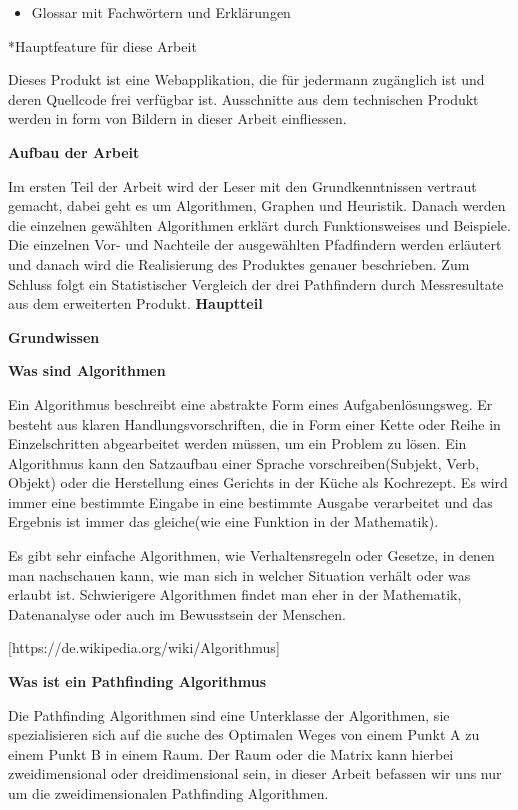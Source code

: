 \begin{itemize}
\item
  Glossar mit Fachwörtern und Erklärungen
\end{itemize}

*Hauptfeature für diese Arbeit

Dieses Produkt ist eine Webapplikation, die für jedermann zugänglich ist
und deren Quellcode frei verfügbar ist. Ausschnitte aus dem technischen
Produkt werden in form von Bildern in dieser Arbeit einfliessen.

\textbf{Aufbau der Arbeit}

Im ersten Teil der Arbeit wird der Leser mit den Grundkenntnissen
vertraut gemacht, dabei geht es um Algorithmen, Graphen und Heuristik.
Danach werden die einzelnen gewählten Algorithmen erklärt durch
Funktionsweises und Beispiele. Die einzelnen Vor- und Nachteile der
ausgewählten Pfadfindern werden erläutert und danach wird die
Realisierung des Produktes genauer beschrieben. Zum Schluss folgt ein
Statistischer Vergleich der drei Pathfindern durch Messresultate aus dem
erweiterten Produkt.
\textbf{Hauptteil}

\textbf{Grundwissen}

\textbf{Was sind Algorithmen}

Ein Algorithmus beschreibt eine abstrakte Form eines Aufgabenlösungsweg.
Er besteht aus klaren Handlungsvorschriften, die in Form einer Kette
oder Reihe in Einzelschritten abgearbeitet werden müssen, um ein Problem
zu lösen. Ein Algorithmus kann den Satzaufbau einer Sprache
vorschreiben(Subjekt, Verb, Objekt) oder die Herstellung eines Gerichts
in der Küche als Kochrezept. Es wird immer eine bestimmte Eingabe in
eine bestimmte Ausgabe verarbeitet und das Ergebnis ist immer das
gleiche(wie eine Funktion in der Mathematik).

Es gibt sehr einfache Algorithmen, wie Verhaltensregeln oder Gesetze, in
denen man nachschauen kann, wie man sich in welcher Situation verhält
oder was erlaubt ist. Schwierigere Algorithmen findet man eher in der
Mathematik, Datenanalyse oder auch im Bewusstsein der Menschen.

{[}https://de.wikipedia.org/wiki/Algorithmus{]}

\textbf{Was ist ein Pathfinding Algorithmus}

Die Pathfinding Algorithmen sind eine Unterklasse der Algorithmen, sie
spezialisieren sich auf die suche des Optimalen Weges von einem Punkt A
zu einem Punkt B in einem Raum. Der Raum oder die Matrix kann hierbei
zweidimensional oder dreidimensional sein, in dieser Arbeit befassen wir
uns nur um die zweidimensionalen Pathfinding Algorithmen.

